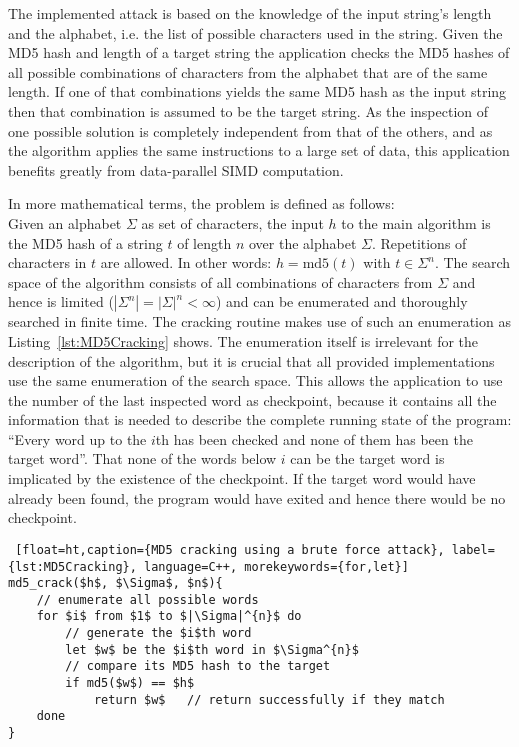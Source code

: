 The implemented attack is based on the knowledge of the input string's length and the alphabet, i.e. the list of possible characters used in the string. Given the MD5 hash and length of a target string the application checks the MD5 hashes of all possible combinations of characters from the alphabet that are of the same length. If one of that combinations yields the same MD5 hash as the input string then that combination is assumed to be the target string. As the inspection of one possible solution is completely independent from that of the others, and as the algorithm applies the same instructions to a large set of data, this application benefits greatly from data-parallel SIMD computation.

In more mathematical terms, the problem is defined as follows:\\ Given an alphabet $\Sigma$ as set of characters, the input $h$ to the main algorithm is the MD5 hash of a string $t$ of length $n$ over the alphabet $\Sigma$. Repetitions of characters in $t$ are allowed. In other words: $h = \text{md5}(t)$ with $t \in \Sigma^{n}$. The search space of the algorithm consists of all combinations of characters from $\Sigma$ and hence is limited ($|\Sigma^{n}| = |\Sigma|^{n} < \infty$) and can be enumerated and thoroughly searched in finite time. The cracking routine makes use of such an enumeration as Listing~\ref{lst:MD5Cracking} shows. The enumeration itself is irrelevant for the description of the algorithm, but it is crucial that all provided implementations use the same enumeration of the search space. This allows the application to use the number of the last inspected word as checkpoint, because it contains all the information that is needed to describe the complete running state of the program: ``Every word up to the $i$th has been checked and none of them has been the target word''. That none of the words below $i$ can be the target word is implicated by the existence of the checkpoint. If the target word would have already been found, the program would have exited and hence there would be no checkpoint.

\begin{lstlisting} [float=ht,caption={MD5 cracking using a brute force attack}, label={lst:MD5Cracking}, language=C++, morekeywords={for,let}]
md5_crack($h$, $\Sigma$, $n$){
	// enumerate all possible words
	for $i$ from $1$ to $|\Sigma|^{n}$ do
		// generate the $i$th word
		let $w$ be the $i$th word in $\Sigma^{n}$
		// compare its MD5 hash to the target
		if md5($w$) == $h$
			return $w$   // return successfully if they match
	done
}
\end{lstlisting} 


